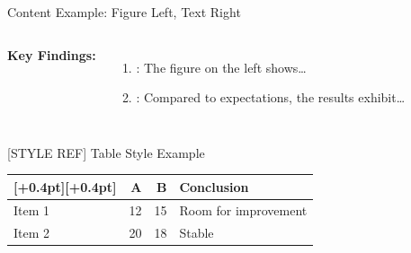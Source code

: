 \documentclass[aspectratio=169,10pt,xcolor=table]{beamer}
\newcommand{\deckheadrow}{\rowcolor{maincolor}[\dimexpr\tabcolsep+0.4pt\relax][\dimexpr\tabcolsep+0.4pt\relax]}
\begin{document}
\begin{frame}{Content Example: Figure Left, Text Right}
\begin{columns}[c]
    \vspace{1em}
    \textbf{Key Findings:}
    \begin{enumerate}
        \item {}: The figure on the left shows\ldots
        \item {}: Compared to expectations, the results exhibit\ldots
    \end{enumerate}
\end{columns}
\end{frame}

\begin{frame}{[STYLE REF] Table Style Example}
\small
\centering
\renewcommand{\arraystretch}{1.25}
\footnotesize
\begin{tabular}{p{} r r l}
\deckheadrow
\multicolumn{1}{l}{\color{white}\bfseries Metric} & {\color{white}\bfseries A}
  & {\color{white}\bfseries B} & {\color{white}\bfseries Conclusion} \\
\midrule
Item 1 & 12 & 15 & Room for improvement \\
Item 2 & 20 & 18 & Stable \\
\bottomrule
\end{tabular}
\end{frame}
\end{document}

